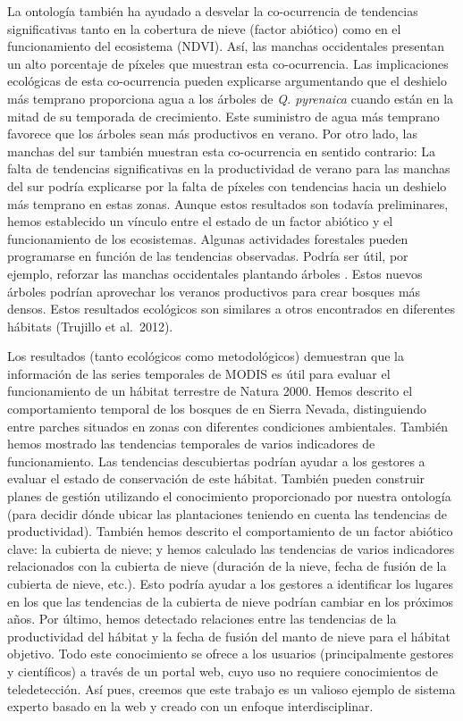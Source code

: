 La ontología también ha ayudado a desvelar la co-ocurrencia de tendencias significativas tanto en la cobertura de nieve (factor abiótico) como en el funcionamiento del ecosistema (NDVI). Así, las manchas occidentales presentan un alto porcentaje de píxeles que muestran esta co-ocurrencia. Las implicaciones ecológicas de esta co-ocurrencia pueden explicarse argumentando que el deshielo más temprano proporciona agua a los árboles de \emph{Q. pyrenaica} cuando están en la mitad de su temporada de crecimiento. Este suministro de agua más temprano favorece que los árboles sean más productivos en verano. Por otro lado, las manchas del sur también muestran esta co-ocurrencia en sentido contrario: La falta de tendencias significativas en la productividad de verano para las manchas del sur podría explicarse por la falta de píxeles con tendencias hacia un deshielo más temprano en estas zonas. Aunque estos resultados son todavía preliminares, hemos establecido un vínculo entre el estado de un factor abiótico y el funcionamiento de los ecosistemas. Algunas actividades forestales pueden programarse en función de las tendencias observadas. Podría ser útil, por ejemplo, reforzar las manchas occidentales plantando árboles \Qp. Estos nuevos árboles podrían aprovechar los veranos productivos para crear bosques más densos. Estos resultados ecológicos son similares a otros encontrados en diferentes hábitats (Trujillo et al.~2012).

Los resultados (tanto ecológicos como metodológicos) demuestran que la información de las series temporales de MODIS es útil para evaluar el funcionamiento de un hábitat terrestre de Natura 2000. Hemos descrito el comportamiento temporal de los bosques de \Qp en Sierra Nevada, distinguiendo entre parches situados en zonas con diferentes condiciones ambientales. También hemos mostrado las tendencias temporales de varios indicadores de funcionamiento. Las tendencias descubiertas podrían ayudar a los gestores a evaluar el estado de conservación de este hábitat. También pueden construir planes de gestión utilizando el conocimiento proporcionado por nuestra ontología (para decidir dónde ubicar las plantaciones teniendo en cuenta las tendencias de productividad). También hemos descrito el comportamiento de un factor abiótico clave: la cubierta de nieve; y hemos calculado las tendencias de varios indicadores relacionados con la cubierta de nieve (duración de la nieve, fecha de fusión de la cubierta de nieve, etc.). Esto podría ayudar a los gestores a identificar los lugares en los que las tendencias de la cubierta de nieve podrían cambiar en los próximos años. Por último, hemos detectado relaciones entre las tendencias de la productividad del hábitat y la fecha de fusión del manto de nieve para el hábitat objetivo. Todo este conocimiento se ofrece a los usuarios (principalmente gestores y científicos) a través de un portal web, cuyo uso no requiere conocimientos de teledetección. Así pues, creemos que este trabajo es un valioso ejemplo de sistema experto basado en la web y creado con un enfoque interdisciplinar.


